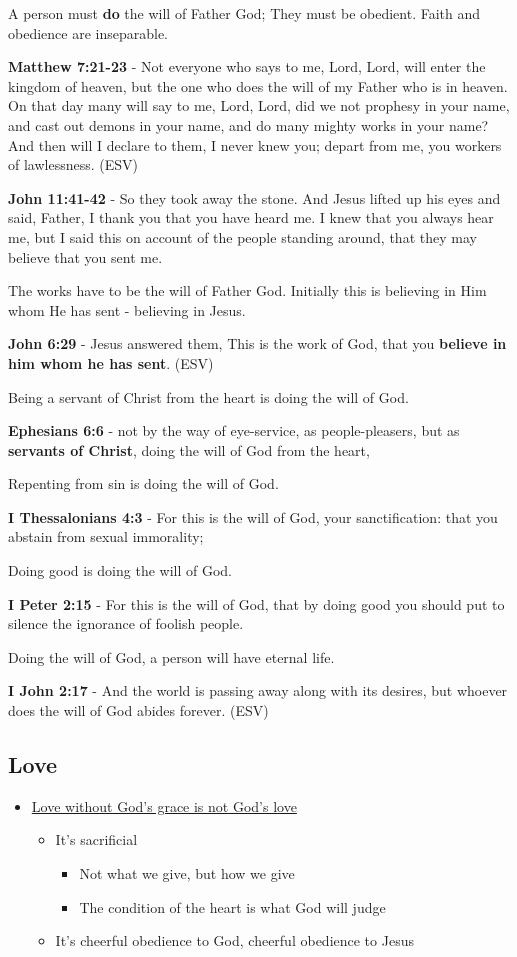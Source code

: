 \documentclass[11pt]{article}
\begin{document}
A person must \textbf{do} the will of Father God; They must be obedient.
Faith and obedience are inseparable.

\textbf{Matthew 7:21-23} - Not everyone who says to me, Lord, Lord, will enter the kingdom of heaven, but the one who does the will of my Father who is in heaven. On that day many will say to me, Lord, Lord, did we not prophesy in your name, and cast out demons in your name, and do many mighty works in your name? And then will I declare to them, I never knew you; depart from me, you workers of lawlessness. (ESV)

\textbf{John 11:41-42} - So they took away the stone. And Jesus lifted up his eyes and said, Father, I thank you that you have heard me. I knew that you always hear me, but I said this on account of the people standing around, that they may believe that you sent me.

The works have to be the will of Father God. Initially this is believing in Him whom He has sent - believing in Jesus.

\textbf{John 6:29} - Jesus answered them, This is the work of God, that you \textbf{believe in him whom he has sent}. (ESV)

Being a servant of Christ from the heart is doing the will of God.

\textbf{Ephesians 6:6} - not by the way of eye-service, as people-pleasers, but as \textbf{servants of Christ}, doing the will of God from the heart,

Repenting from sin is doing the will of God.

\textbf{I Thessalonians 4:3} - For this is the will of God, your sanctification: that you abstain from sexual immorality;

Doing good is doing the will of God.

\textbf{I Peter 2:15} - For this is the will of God, that by doing good you should put to silence the ignorance of foolish people.

Doing the will of God, a person will have eternal life.

\textbf{I John 2:17} - And the world is passing away along with its desires, but whoever does the will of God abides forever. (ESV)

\subsection{Love}
\label{sec:org7e4009e}
\begin{itemize}
\item \href{https://www.youtube.com/watch?v=d2FKSxaa76w\&ab\_channel=FatherSpyridon}{Love without God's grace is not God's love}
\begin{itemize}
\item It's sacrificial
\begin{itemize}
\item Not what we give, but how we give
\item The condition of the heart is what God will judge
\end{itemize}
\item It's cheerful obedience to God, cheerful obedience to Jesus
\end{itemize}
\end{itemize}
\end{document}
